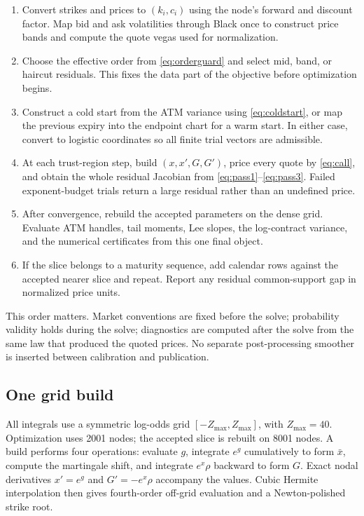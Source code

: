 \begin{enumerate}
\item Convert strikes and prices to $(k_i,c_i)$ using the node's forward and
discount factor.  Map bid and ask volatilities through Black once to construct
price bands and compute the quote vegas used for normalization.
\item Choose the effective order from \eqref{eq:orderguard} and select mid,
band, or haircut residuals.  This fixes the data part of the objective before
optimization begins.
\item Construct a cold start from the ATM variance using
\eqref{eq:coldstart}, or map the previous expiry into the endpoint chart for a
warm start.  In either case, convert to logistic coordinates so all finite
trial vectors are admissible.
\item At each trust-region step, build $(x,x',G,G')$, price every quote by
\eqref{eq:call}, and obtain the whole residual Jacobian from
\eqref{eq:pass1}--\eqref{eq:pass3}.  Failed exponent-budget trials return a
large residual rather than an undefined price.
\item After convergence, rebuild the accepted parameters on the dense grid.
Evaluate ATM handles, tail moments, Lee slopes, the log-contract variance, and
the numerical certificates from this one final object.
\item If the slice belongs to a maturity sequence, add calendar rows against
the accepted nearer slice and repeat.  Report any residual common-support
gap in normalized price units.
\end{enumerate}

This order matters.  Market conventions are fixed before the solve;
probability validity holds during the solve; diagnostics are computed after
the solve from the same law that produced the quoted prices.  No separate
post-processing smoother is inserted between calibration and publication.

\subsection{One grid build}

All integrals use a symmetric log-odds grid
$[-Z_{\max},Z_{\max}]$, with $Z_{\max}=40$.  Optimization uses 2001 nodes;
the accepted slice is rebuilt on 8001 nodes.  A build performs four operations:
evaluate $g$, integrate $e^g$ cumulatively to form $\bar x$, compute the
martingale shift, and integrate $e^x\rho$ backward to form $G$.  Exact nodal
derivatives $x'=e^g$ and $G'=-e^x\rho$ accompany the values.  Cubic Hermite
interpolation then gives fourth-order off-grid evaluation and a
Newton-polished strike root.

